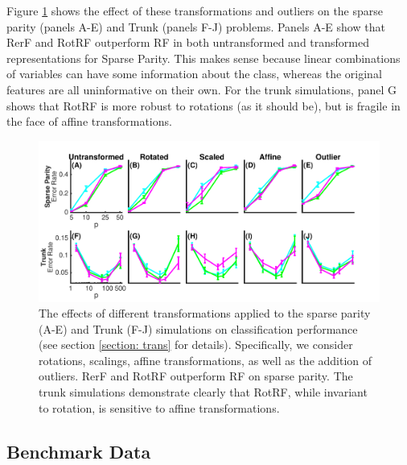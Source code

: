 \documentclass{article}
\begin{document}
Figure \ref{transformations} shows the effect of these transformations and outliers on the sparse parity (panels A-E) and Trunk (panels F-J) problems. Panels A-E show that RerF and RotRF outperform RF in both untransformed and transformed representations for Sparse Parity. This makes sense because linear combinations of variables can have some information about the class, whereas the original features are all uninformative on their own. For the trunk simulations, panel G shows that RotRF is more robust to rotations (as it should be), but is fragile in the face of affine transformations.

\begin{figure}[ht]
\vskip 0.2in
\begin{center}
\centerline{\includegraphics[width=\columnwidth]{../Figures/pdf/Fig3_transformations2}}
\caption{The effects of different transformations applied to the sparse parity (A-E) and Trunk (F-J) simulations on classification performance (see section \ref{section: trans} for details). Specifically, we consider rotations, scalings, affine transformations, as well as the addition of outliers. RerF and RotRF outperform RF on sparse parity. The trunk simulations demonstrate clearly that RotRF, while invariant to rotation, is sensitive to affine transformations.}
\label{transformations}
\end{center}
\vskip -0.2in
\end{figure}

\subsection{Benchmark Data}
\label{section: benchmark}
\end{document}
